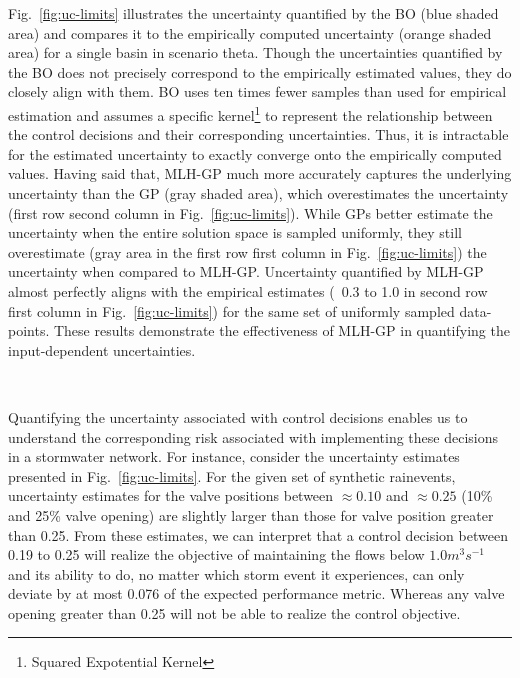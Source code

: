 Fig.~\ref{fig:uc-limits} illustrates the uncertainty quantified by the BO (blue shaded area) and compares it to the empirically computed uncertainty (orange shaded area) for a single basin in scenario theta.
Though the uncertainties quantified by the BO does not precisely correspond to the empirically estimated values, they do closely align with them.
BO uses ten times fewer samples than used for empirical estimation and assumes a specific kernel\footnote{Squared Expotential Kernel} to represent the relationship between the control decisions and their corresponding uncertainties.
Thus, it is intractable for the estimated uncertainty to exactly converge onto the empirically computed values.
Having said that, MLH-GP much more accurately captures the underlying uncertainty than the GP (gray shaded area), which overestimates the uncertainty  (first row second column in Fig.~\ref{fig:uc-limits}).
While GPs better estimate the uncertainty when the entire solution space is sampled uniformly, they still overestimate (gray area in the first row first column in Fig.~\ref{fig:uc-limits}) the uncertainty when compared to MLH-GP\@.
Uncertainty quantified by MLH-GP almost perfectly aligns with the empirical estimates (~0.3 to 1.0 in second row first column in Fig.~\ref{fig:uc-limits}) for the same set of uniformly sampled data-points.
These results demonstrate the effectiveness of MLH-GP in quantifying the input-dependent uncertainties. 

\


Quantifying the uncertainty associated with control decisions enables us to understand the corresponding risk associated with implementing these decisions in a stormwater network. 
For instance, consider the uncertainty estimates presented in Fig.~\ref{fig:uc-limits}.
For the given set of synthetic rainevents, uncertainty estimates for the valve positions between $\approx0.10$ and $\approx0.25$ (10\% and 25\% valve opening) are slightly larger than those for valve position greater than 0.25.  
From these estimates, we can interpret that a control decision between 0.19 to 0.25 will realize the objective of maintaining the flows below $1.0 m^3 s^{-1}$ and its ability to do, no matter which storm event it experiences, can only deviate by at most 0.076 of the expected performance metric.
Whereas any valve opening greater than 0.25 will not be able to realize the control objective.


